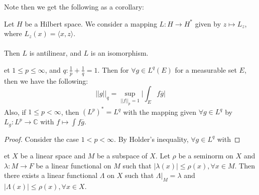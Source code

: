 \documentclass[12pt]{article}
\newenvironment{theorem}[2][Theorem]{\begin{trivlist}
\item[\hskip \labelsep {\bfseries #1}\hskip \labelsep {\bfseries #2.}]}{\end{trivlist}}
\begin{document}
Note then we get the following as a corollary:
\begin{theorem}{Riesz Corollary}
    Let $H$ be a Hilbert space. We consider a mapping $L: H \rightarrow H^*$ given by $z \mapsto L_z$, where $L_z(x) = \langle x, z \rangle$. \\ \\
    Then $L$ is antilinear, and $L$ is an isomorphism.
\end{theorem}

\begin{theorem}
    Let $1 \leq p \leq \infty$, and $q : \frac{1}{p} + \frac{1}{q} = 1$. Then for $\forall g \in L^q(E)$ for a measurable set $E$, then we have the following:
    \begin{equation}
        ||g||_{q} = \underset{||f||_p = 1}{\sup} \Big | \int_E f\overline{g} \Big |
    \end{equation}
    Also, if $1 \leq p < \infty$, then $(L^p)^* = L^q$ with the mapping given $\forall g \in L^q$ by $L_g : L^p \rightarrow \mathbb{C}$ with $f \mapsto \int f \overline{g}$. 
    \begin{proof}
        Consider the case $1 < p < \infty$. By Holder's inequality, $\forall g \in L^q$ with
    \end{proof}
\end{theorem}

\begin{theorem}
    Let $X$ be a linear space and $M$ be a subspace of $X$. Let $\rho$ be a seminorm on $X$ and $\lambda: M \rightarrow F$ be a linear functional on $M$ such that $|\lambda(x)| \leq \rho(x), \forall x \in M$. Then there exists a linear functional $\Lambda$ on $X$ such that $\Lambda \vert_M = \lambda$ and $|\Lambda(x)| \leq \rho(x), \forall x \in X$. 
\end{theorem}
\end{document}
